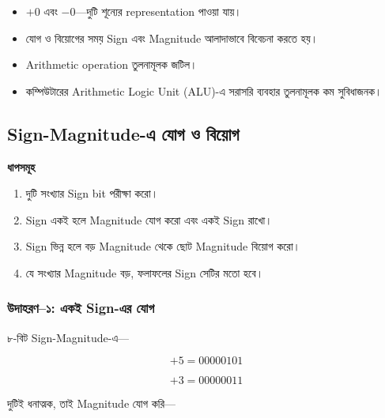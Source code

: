 \begin{itemize}[label={{\bulletfont\textbullet}}, leftmargin=*, nosep]
    \item $+0$ এবং $-0$—দুটি শূন্যের \textenglish{representation} পাওয়া যায়।
    \item যোগ ও বিয়োগের সময় \textenglish{Sign} এবং
    \textenglish{Magnitude} আলাদাভাবে বিবেচনা করতে হয়।
    \item \textenglish{Arithmetic operation} তুলনামূলক জটিল।
    \item কম্পিউটারের \textenglish{Arithmetic Logic Unit (ALU)}-এ
    সরাসরি ব্যবহার তুলনামূলক কম সুবিধাজনক।
\end{itemize}


\subsection{\textenglish{Sign-Magnitude}-এ যোগ ও বিয়োগ}

\par\begingroup

\textbf{ধাপসমূহ}

\begin{enumerate}
    \item দুটি সংখ্যার \textenglish{Sign bit} পরীক্ষা করো।
    \item \textenglish{Sign} একই হলে
    \textenglish{Magnitude} যোগ করো এবং একই \textenglish{Sign} রাখো।
    \item \textenglish{Sign} ভিন্ন হলে বড়
    \textenglish{Magnitude} থেকে ছোট \textenglish{Magnitude} বিয়োগ করো।
    \item যে সংখ্যার \textenglish{Magnitude} বড়,
    ফলাফলের \textenglish{Sign} সেটির মতো হবে।
\end{enumerate}
\par\endgroup


\subsubsection*{উদাহরণ--১: একই \textenglish{Sign}-এর যোগ}

৮-বিট \textenglish{Sign-Magnitude}-এ—

\[
+5=00000101
\]

\[
+3=00000011
\]

দুটিই ধনাত্মক, তাই \textenglish{Magnitude} যোগ করি—


